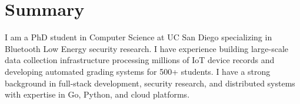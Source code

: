 \section{Summary}
I am a PhD student in Computer Science at UC San Diego specializing in Bluetooth Low Energy security research. I have experience building large-scale data collection infrastructure processing millions of IoT device records and developing automated grading systems for 500+ students. I have a strong background in full-stack development, security research, and distributed systems with expertise in Go, Python, and cloud platforms.
